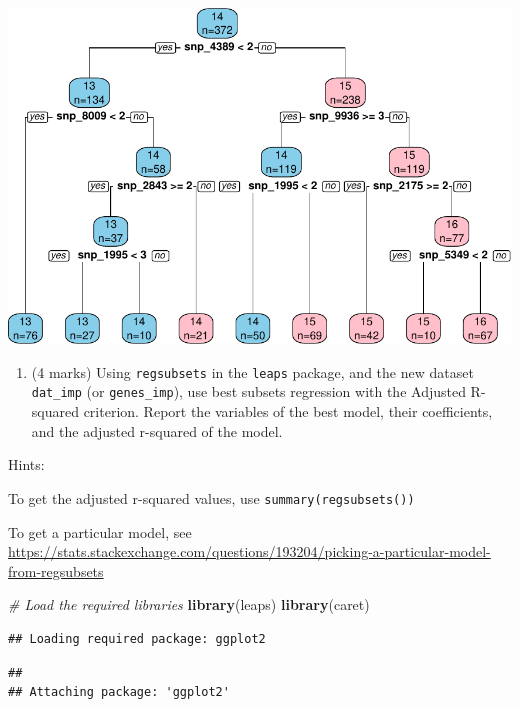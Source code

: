 \documentclass[
]{article}
\newenvironment{Shaded}{\begin{snugshade}}{\end{snugshade}}
\newcommand{\CommentTok}[1]{\textcolor[rgb]{0.56,0.35,0.01}{\textit{#1}}}
\newcommand{\FunctionTok}[1]{\textcolor[rgb]{0.13,0.29,0.53}{\textbf{#1}}}
\newcommand{\NormalTok}[1]{#1}
\providecommand{\tightlist}{%
  \setlength{\itemsep}{0pt}\setlength{\parskip}{0pt}}
\begin{document}
\includegraphics{STAT847_W24_Analysis2_files/figure-latex/unnamed-chunk-5-1.pdf}

\vspace{2cm}
\newpage

\begin{enumerate}
\def\labelenumi{\arabic{enumi}.}
\setcounter{enumi}{4}
\tightlist
\item
  (4 marks) Using \texttt{regsubsets} in the \texttt{leaps} package, and
  the new dataset \texttt{dat\_imp} (or \texttt{genes\_imp}), use best
  subsets regression with the Adjusted R-squared criterion. Report the
  variables of the best model, their coefficients, and the adjusted
  r-squared of the model.
\end{enumerate}

Hints:

To get the adjusted r-squared values, use \texttt{summary(regsubsets())}

To get a particular model, see
\url{https://stats.stackexchange.com/questions/193204/picking-a-particular-model-from-regsubsets}

\begin{Shaded}
\begin{Highlighting}[]
\CommentTok{\# Load the required libraries}
\FunctionTok{library}\NormalTok{(leaps)}
\FunctionTok{library}\NormalTok{(caret)}
\end{Highlighting}
\end{Shaded}

\begin{verbatim}
## Loading required package: ggplot2
\end{verbatim}

\begin{verbatim}
## 
## Attaching package: 'ggplot2'
\end{verbatim}
\end{document}
